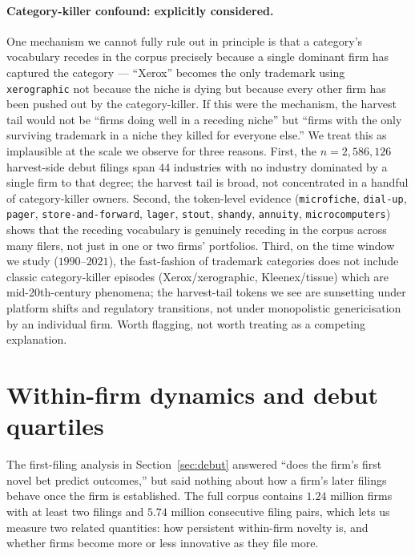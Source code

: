 \documentclass[11pt]{article}
\begin{document}
\paragraph{Category-killer confound: explicitly considered.} One
mechanism we cannot fully rule out in principle is that a category's
vocabulary recedes in the corpus precisely because a single dominant
firm has captured the category --- ``Xerox'' becomes the only
trademark using \texttt{xerographic} not because the niche is dying
but because every other firm has been pushed out by the
category-killer. If this were the mechanism, the harvest tail would
not be ``firms doing well in a receding niche'' but ``firms with the
only surviving trademark in a niche they killed for everyone else.''
We treat this as implausible at the scale we observe for three
reasons. First, the $n = 2{,}586{,}126$ harvest-side debut filings
span $44$ industries with no industry dominated by a single firm to
that degree; the harvest tail is broad, not concentrated in a
handful of category-killer owners. Second, the token-level evidence
(\texttt{microfiche}, \texttt{dial-up}, \texttt{pager},
\texttt{store-and-forward}, \texttt{lager}, \texttt{stout},
\texttt{shandy}, \texttt{annuity}, \texttt{microcomputers}) shows
that the receding vocabulary is genuinely receding in the corpus
across many filers, not just in one or two firms' portfolios.
Third, on the time window we study ($1990$--$2021$), the
fast-fashion of trademark categories does not include classic
category-killer episodes (Xerox/xerographic, Kleenex/tissue) which
are mid-20th-century phenomena; the harvest-tail tokens we see are
sunsetting under platform shifts and regulatory transitions, not
under monopolistic genericisation by an individual firm. Worth
flagging, not worth treating as a competing explanation.

\section{Within-firm dynamics and debut quartiles}
\label{sec:dynamics}

The first-filing analysis in Section~\ref{sec:debut} answered ``does
the firm's first novel bet predict outcomes,'' but said nothing about
how a firm's later filings behave once the firm is established. The
full corpus contains $1.24$ million firms with at least two filings
and $5.74$ million consecutive filing pairs, which lets us measure
two related quantities: how persistent within-firm novelty is, and
whether firms become more or less innovative as they file more.
\end{document}
